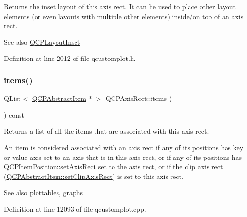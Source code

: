 Returns the inset layout of this axis rect. It can be used to place other layout elements (or even layouts with multiple other elements) inside/on top of an axis rect.

\begin{DoxySeeAlso}{See also}
\hyperlink{class_q_c_p_layout_inset}{Q\+C\+P\+Layout\+Inset} 
\end{DoxySeeAlso}


Definition at line 2012 of file qcustomplot.\+h.

\mbox{\label{class_q_c_p_axis_rect_a03c113a2175448300ee8f944e24776ba}} 
\subsubsection{\texorpdfstring{items()}{items()}}
{\footnotesize\ttfamily Q\+List$<$ \hyperlink{class_q_c_p_abstract_item}{Q\+C\+P\+Abstract\+Item} $\ast$ $>$ Q\+C\+P\+Axis\+Rect\+::items (\begin{DoxyParamCaption}{ }\end{DoxyParamCaption}) const}

Returns a list of all the items that are associated with this axis rect.

An item is considered associated with an axis rect if any of its positions has key or value axis set to an axis that is in this axis rect, or if any of its positions has \hyperlink{class_q_c_p_item_position_a0cd9b326fb324710169e92e8ca0041c2}{Q\+C\+P\+Item\+Position\+::set\+Axis\+Rect} set to the axis rect, or if the clip axis rect (\hyperlink{class_q_c_p_abstract_item_a7dc75fcbcd10206fe0b75d757ea7a347}{Q\+C\+P\+Abstract\+Item\+::set\+Clip\+Axis\+Rect}) is set to this axis rect.

\begin{DoxySeeAlso}{See also}
\hyperlink{class_q_c_p_axis_rect_a587d073a97b27bc7293fab4b2774ad59}{plottables}, \hyperlink{class_q_c_p_axis_rect_a2d9ded3eca97be1fcb5867949391bb88}{graphs} 
\end{DoxySeeAlso}


Definition at line 12093 of file qcustomplot.\+cpp.

\mbox{\label{class_q_c_p_axis_rect_afb4a3de02046b20b9310bdb8fca781c3}} 
